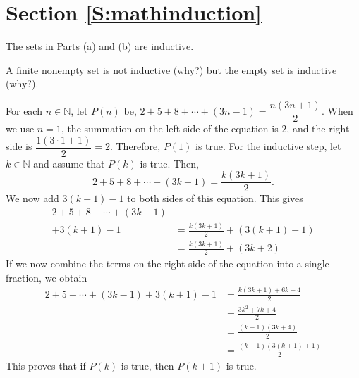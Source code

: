 \section*{Section \ref{S:mathinduction}}
\renewcommand{\labelenumi}{(\textbf{\alph{enumi}})}

\begin{list}{\bf{\ref{exer:sec51-1}.}}
\item The sets in Parts (a) and (b) are inductive.
\end{list}

\begin{list}{\bf{\ref{exer:sec51-2}.}}
\item A finite nonempty set is not inductive (why?) but the empty set is inductive (why?).
\end{list}

\begin{list}{\bf{\ref{exer:sec51-3}.}}
\item \begin{list}{\bf{(a)}}
\item For each  $n \in \mathbb{N}$, let  $P( n )$ be, 
$2 + 5 + 8 +  \cdots  + (3n - 1) = \dfrac{{n( {3n + 1} )}}{2}$.  When we use $n = 1$, the summation on the left side of the equation is 2, and the right side is $\dfrac{1(3 \cdot 1 + 1)}{2} = 2$.  Therefore, $P( 1 )$  is true.   For the inductive step, let $k \in \mathbb{N}$ and assume that 
$P \left( k \right)$ is true.  Then,
\[
  2 + 5 + 8 + \cdots  + \left( {3k - 1} \right) = \frac{{k \left( {3k + 1} \right)}}{2}. 
\]
We now add $3 \left( k + 1 \right) - 1$ to both sides of this equation.  This gives
\begin{align*}
  2 + 5 + 8 + \cdots  + (3k - 1) & \\
+ 3 \left( {k + 1} \right)-1 &= 
           \frac{{k \left( {3k + 1} \right)}}{2} + \left( 3 \left( k + 1 \right) - 1 \right) \\   
   &= \frac{{k \left( {3k + 1} \right)}}{2} + \left( {3k + 2} \right)
\end{align*}
If we now combine the terms on the right side of the equation into a single fraction, we obtain
\begin{align*} 
 2 + 5 +  \cdots  + \left( {3k - 1} \right) + 3 \left( {k + 1} \right)-1  &= \frac{k \left( 3k + 1 \right) + 6k+4}{2} \\
   &= \frac{ 3k^2 + 7k + 4}{2} \\
   &= \frac{ \left( k + 1 \right) \left( 3k + 4 \right)}{2} \\
   &= \frac{ \left( k + 1 \right) \left( 3 \left( k + 1 \right) + 1 \right)}{2}
\end{align*}
This proves that if  $P\left( k \right)$ is true, then $P\left( {k + 1} \right)$ is true.







\end{list}
\end{list}

